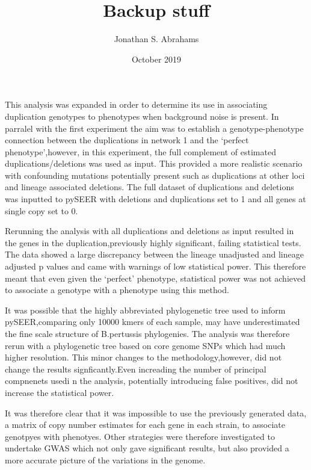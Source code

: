 \documentclass{article}
\title{Backup stuff}
\author{Jonathan S. Abrahams }
\date{October 2019}
\begin{document}
\maketitle
 This analysis was expanded in order to determine its use in associating duplication genotypes to phenotypes when background noise is present. In parralel with the first experiment the aim was to establish a genotype-phenotype connection between the duplications in network 1 and the `perfect phenotype',however, in this experiment, the full complement of estimated duplications/deletions was used as input. This provided a more realistic scenario with confounding mutations potentially present such as duplications at other loci and lineage associated deletions. The full dataset of duplications and deletions was inputted to pySEER with deletions and duplications set to 1 and all genes at single copy set to 0. 
 
 Rerunning the analysis with all duplications and deletions as input resulted in the genes in the duplication,previously highly significant, failing statistical tests. The data showed a large discrepancy between the lineage unadjusted and lineage adjusted p values and came with warnings of low statistical power. This therefore meant that even given the `perfect' phenotype, statistical power was not achieved to associate a genotype with a phenotype using this method. 
 
 It was possible that the highly abbreviated phylogenetic tree used to inform pySEER,comparing only 10000 kmers of each sample, may have underestimated the fine scale structure of B.pertussis phylogenies. The analysis was therefore rerun with a phylogenetic tree based on core genome SNPs which had much higher resolution. This minor changes to the methodology,however, did not change the results signficantly.Even increading the number of principal compnenets usedi n the analysis, potentially introducing false positives, did not increase the statistical power.
 
 
 It was therefore clear that it was impossible to use the previously generated data, a matrix of copy number estimates for each gene in each strain, to associate genotpyes with phenotyes. Other strategies were therefore investigated to undertake GWAS which not only gave significant results, but also provided a more accurate picture of the variations in the genome.
\end{document}
